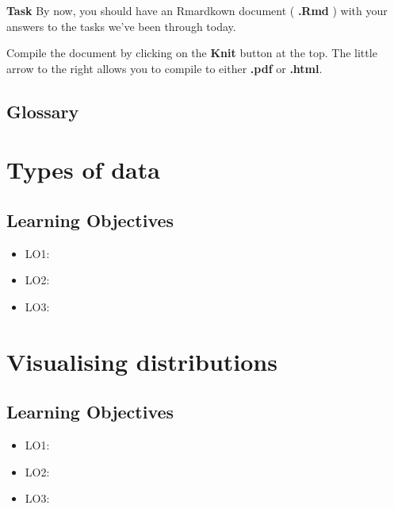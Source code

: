 \documentclass[12pt,]{krantz}
\providecommand{\tightlist}{%
  \setlength{\itemsep}{0pt}\setlength{\parskip}{0pt}}
\begin{document}
\textbf{Task}
By now, you should have an Rmardkown document ( \textbf{.Rmd} ) with your answers to the tasks we've been through today.

Compile the document by clicking on the \textbf{Knit} button at the top. The little arrow to the right allows you to compile to either \textbf{.pdf} or \textbf{.html}.

\hypertarget{glossary}{%
\subsection*{Glossary}\label{glossary}}

\hypertarget{chap-data-types}{%
\section{Types of data}\label{chap-data-types}}

\hypertarget{learning-objectives-1}{%
\subsection*{Learning Objectives}\label{learning-objectives-1}}

\begin{itemize}
\tightlist
\item
  LO1:
\item
  LO2:
\item
  LO3:
\end{itemize}

\hypertarget{chap-visualising-distributions}{%
\section{Visualising distributions}\label{chap-visualising-distributions}}

\hypertarget{learning-objectives-2}{%
\subsection*{Learning Objectives}\label{learning-objectives-2}}

\begin{itemize}
\tightlist
\item
  LO1:
\item
  LO2:
\item
  LO3:
\end{itemize}
\end{document}
